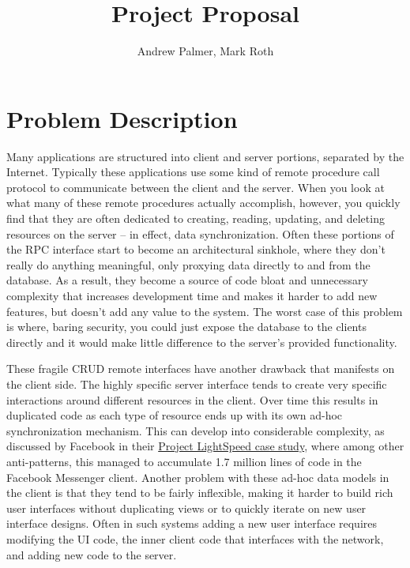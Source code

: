 \documentclass[12pt]{article}
\title{Project Proposal}
\author{Andrew Palmer, Mark Roth}
\begin{document}
    \maketitle

    \section{Problem Description}
    Many applications are structured into client and server portions, separated by the Internet.
    Typically these applications use some kind of remote procedure call protocol to communicate between the client and the server.
    When you look at what many of these remote procedures actually accomplish, however, you quickly find that they are often dedicated to creating, reading, updating, and deleting resources on the server -- in effect, data synchronization.
    Often these portions of the RPC interface start to become an architectural sinkhole, where they don't really do anything meaningful, only proxying data directly to and from the database.
    As a result, they become a source of code bloat and unnecessary complexity that increases development time and makes it harder to add new features, but doesn't add any value to the system.
    The worst case of this problem is where, baring security, you could just expose the database to the clients directly and it would make little difference to the server's provided functionality.

    These fragile CRUD remote interfaces have another drawback that manifests on the client side.
    The highly specific server interface tends to create very specific interactions around different resources in the client.
    Over time this results in duplicated code as each type of resource ends up with its own ad-hoc synchronization mechanism.
    This can develop into considerable complexity, as discussed by Facebook in their \href{https://engineering.fb.com/2020/03/02/data-infrastructure/messenger/}{Project LightSpeed case study}, where among other anti-patterns, this managed to accumulate 1.7 million lines of code in the Facebook Messenger client.
    Another problem with these ad-hoc data models in the client is that they tend to be fairly inflexible, making it harder to build rich user interfaces without duplicating views or to quickly iterate on new user interface designs.
    Often in such systems adding a new user interface requires modifying the UI code, the inner client code that interfaces with the network, and adding new code to the server.
\end{document}
